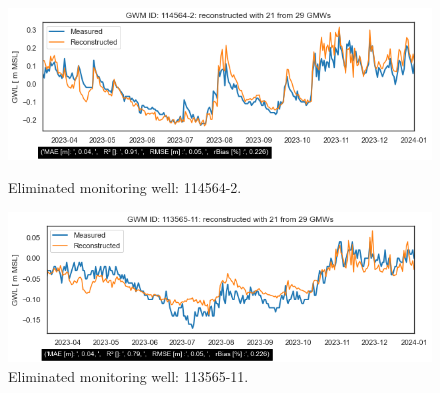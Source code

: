 \begin{figure}[h]
    \centering
    \begin{minipage}{0.48\textwidth}
        \centering
        \includegraphics[width=\linewidth]{frontmatter/Rozenburg-fig/1145642roz.png}
        \caption{Eliminated monitoring well: 114564-2.}
        \label{roz1}
    \end{minipage}\hfill
    \begin{minipage}{0.48\textwidth}
        \centering
        \includegraphics[width=\linewidth]{frontmatter/Rozenburg-fig/11356511roz.png}
        \caption{Eliminated monitoring well: 113565-11. }
        \label{113565-11}
    \end{minipage}
    

\end{figure}
